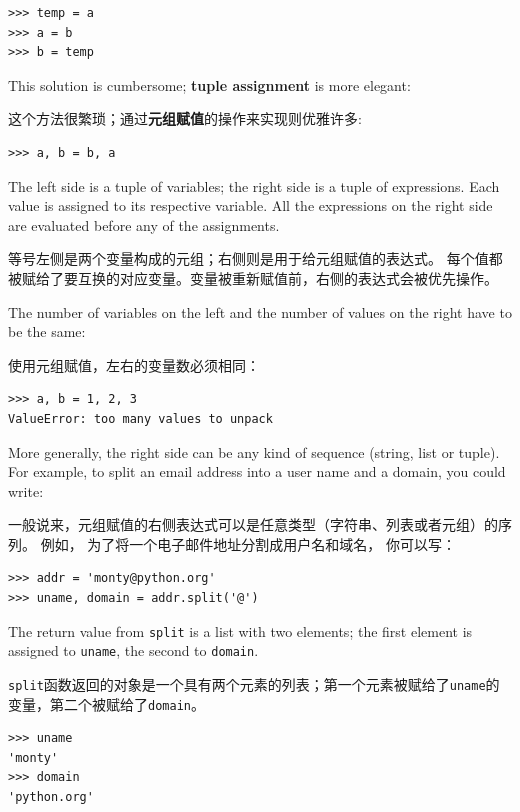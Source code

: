 \begin{lstlisting}
>>> temp = a
>>> a = b
>>> b = temp
\end{lstlisting}
%
This solution is cumbersome; {\bf tuple assignment} is more elegant:

这个方法很繁琐；通过{\bf 元组赋值}的操作来实现则优雅许多:

\begin{lstlisting}
>>> a, b = b, a
\end{lstlisting}
%
The left side is a tuple of variables; the right side is a tuple of
expressions.  Each value is assigned to its respective variable.
All the expressions on the right side are evaluated before any
of the assignments.

等号左侧是两个变量构成的元组；右侧则是用于给元组赋值的表达式。  每个值都被赋给了要互换的对应变量。变量被重新赋值前，右侧的表达式会被优先操作。

The number of variables on the left and the number of
values on the right have to be the same:

使用元组赋值，左右的变量数必须相同：


\begin{lstlisting}
>>> a, b = 1, 2, 3
ValueError: too many values to unpack
\end{lstlisting}
%
More generally, the right side can be any kind of sequence
(string, list or tuple).  For example, to split an email address
into a user name and a domain, you could write:

一般说来，元组赋值的右侧表达式可以是任意类型（字符串、列表或者元组）的序列。 例如， 为了将一个电子邮件地址分割成用户名和域名， 你可以写：


\begin{lstlisting}
>>> addr = 'monty@python.org'
>>> uname, domain = addr.split('@')
\end{lstlisting}
%
The return value from {\tt split} is a list with two elements;
the first element is assigned to {\tt uname}, the second to
{\tt domain}.

\lstinline{split}函数返回的对象是一个具有两个元素的列表；第一个元素被赋给了\lstinline{uname}的变量，第二个被赋给了\lstinline{domain}。

\begin{lstlisting}
>>> uname
'monty'
>>> domain
'python.org'
\end{lstlisting}
%

